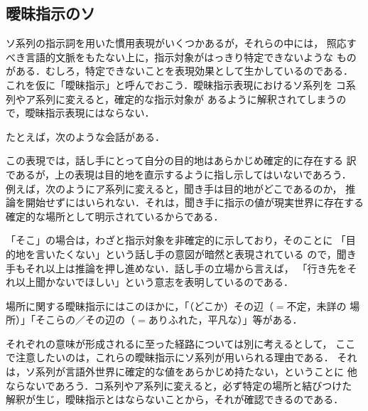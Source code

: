 \subsection{曖昧指示のソ}
ソ系列の指示詞を用いた慣用表現がいくつかあるが，それらの中には，
照応すべき言語的文脈をもたない上に，指示対象がはっきり特定できないような
ものがある．むしろ，特定できないことを表現効果として生かしているのである．
これを仮に「曖昧指示」と呼んでおこう．曖昧指示表現におけるソ系列を
コ系列やア系列に変えると，確定的な指示対象が
あるように解釈されてしまうので，曖昧指示表現にはならない．

たとえば，次のような会話がある．


この表現では，話し手にとって自分の目的地はあらかじめ確定的に存在する
訳であるが，上の表現は目的地を直示するように指し示してはいないであろう．
例えば，次のようにア系列に変えると，聞き手は目的地がどこであるのか，
推論を開始せずにはいられない．それは，聞き手に指示の値が現実世界に存在する
確定的な場所として明示されているからである．


「そこ」の場合は，わざと指示対象を非確定的に示しており，そのことに
「目的地を言いたくない」という話し手の意図が暗然と表現されている
ので，聞き手もそれ以上は推論を押し進めない．話し手の立場から言えば，
「行き先をそれ以上聞かないでほしい」という意志を表明しているのである．

場所に関する曖昧指示にはこのほかに，「（どこか）その辺（$=$不定，未詳の
場所）」「そこらの／その辺の（$=$ありふれた，平凡な）」等がある．



それぞれの意味が形成されるに至った経路については別に考えるとして，
ここで注意したいのは，これらの曖昧指示にソ系列が用いられる理由である．
それは，ソ系列が言語外世界に確定的な値をあらかじめ持たない，ということに
他ならないであろう．コ系列やア系列に変えると，必ず特定の場所と結びつけた
解釈が生じ，曖昧指示とはならないことから，それが確認できるのである．

